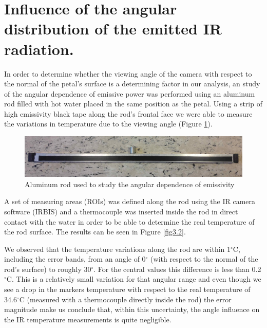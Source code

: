 	\section{Influence of the angular distribution of the emitted IR radiation.}\label{section3.2}
	
		In order to determine whether the viewing angle of the camera with respect to the normal of the petal's surface is a determining factor in our analysis, an study of the angular dependence of emissive power was performed using an aluminum rod filled with hot water placed in the same position as the petal. Using a strip of high emissivity black tape along the rod’s frontal face we were able to measure the variations in temperature due to the viewing angle (Figure \ref{fig3.1}).
	
		\begin{figure}[ht!]
			\centering
			\captionsetup{justification=centering,margin=2cm}
			\includegraphics[scale=0.30]{Figures/Chapter03/AluminumRod.jpg}
			\caption{Aluminum rod used to study the angular dependence of emissivity}\label{fig3.1}
		\end{figure}		
	
		A set of measuring areas (ROIs) was defined along the rod using the IR camera software (IRBIS) and a thermocouple was inserted inside the rod in direct contact with the water in order to be able to determine the real temperature of the rod surface. The results can be seen in Figure \ref{fig3.2}. 
		
		We observed that the temperature variations along the rod are within 1$^{\circ}$C, including the error bands, from an angle of 0$^\circ$ (with respect to the normal of the rod’s surface) to roughly 30$^\circ$. For the central values this difference is less than 0.2$^{\circ}$C. This is a relatively small variation for that angular range and even though we see a drop in the markers temperature with respect to the real temperature of 34.6$^{\circ}$C (measured with a thermocouple directly inside the rod) the error magnitude make us conclude that, within this uncertainty, the angle influence on the IR temperature measurements is quite negligible.
		
